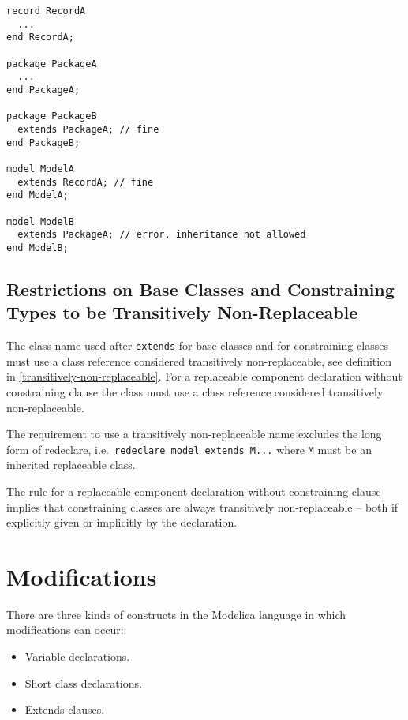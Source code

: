 \begin{example}
\begin{lstlisting}[language=modelica]
record RecordA
  ...
end RecordA;

package PackageA
  ...
end PackageA;

package PackageB
  extends PackageA; // fine
end PackageB;

model ModelA
  extends RecordA; // fine
end ModelA;

model ModelB
  extends PackageA; // error, inheritance not allowed
end ModelB;
\end{lstlisting}
\end{example}

\subsection{Restrictions on Base Classes and Constraining Types to be Transitively Non-Replaceable}\label{restrictions-on-base-classes-and-constraining-types-to-be-transitively-non-replaceable}

The class name used after \lstinline!extends! for base-classes and for constraining classes must use a class reference considered transitively non-replaceable, see definition in \cref{transitively-non-replaceable}.  For a replaceable component declaration without constraining clause the class must use a class reference considered transitively non-replaceable.

\begin{nonnormative}
The requirement to use a transitively non-replaceable name excludes the long form of redeclare, i.e.\ \lstinline!redeclare model extends M...! where
\lstinline!M! must be an inherited replaceable class.
\end{nonnormative}

\begin{nonnormative}
The rule for a replaceable component declaration without constraining clause implies that constraining classes are always transitively non-replaceable -- both
if explicitly given or implicitly by the declaration.
\end{nonnormative}

\section{Modifications}\label{modifications}

There are three kinds of constructs in the Modelica language in which
modifications can occur:
\begin{itemize}
\item
  Variable declarations.
\item
  Short class declarations.
\item
  Extends-clauses.
\end{itemize}

